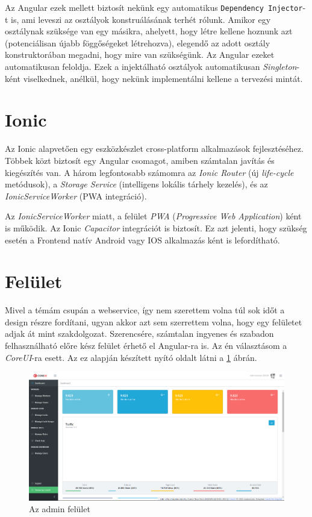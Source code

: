 \documentclass[a4paper,12pt]{thesis-ekf}
\theoremstyle{definition}
\begin{document}
    		Az Angular ezek mellett biztosít nekünk egy automatikus \verb|Dependency Injector|-t is, ami leveszi az osztályok konstruálásának terhét rólunk. Amikor egy osztálynak szüksége van egy másikra, ahelyett, hogy létre kellene hoznunk azt (potenciálisan újabb föggőségeket létrehozva), elegendő az adott osztály konstruktorában megadni, hogy mire van szükségünk. Az Angular ezeket automatikusan feloldja. Ezek a injektálható osztályok automatikusan \emph{Singleton}-ként viselkednek, anélkül, hogy nekünk implementálni kellene a tervezési mintát.\cite{angular-di}
		
		\section{Ionic}\label{sc-ionic}
    		Az Ionic alapvetően egy eszközkészlet cross-platform alkalmazások fejlesztéséhez. Többek közt biztosít egy Angular csomagot, amiben számtalan javítás és kiegészítés van\cite{ionic-intro}. A három legfontosabb számomra az \emph{Ionic Router} (új \emph{life-cycle} metódusok), a \emph{Storage Service} (intelligens lokális tárhely kezelés), és az \emph{IonicServiceWorker} (PWA integráció).
    		
    		Az \emph{IonicServiceWorker} miatt, a felület \emph{PWA} (\emph{Progressive Web Application}) ként is működik. Az Ionic \emph{Capacitor} integrációt is biztosít. Ez azt jelenti, hogy szükség esetén a Frontend natív Android vagy IOS alkalmazás ként is lefordítható.\cite{ionic-cap}
    		
		\section{Felület}
		    Mivel a témám csupán a webservice, így nem szerettem volna túl sok időt a design részre fordítani, ugyan akkor azt sem szerrettem volna, hogy egy  felületet adjak át mint szakdolgozat. Szerencsére, számtalan ingyenes és szabadon felhasználható előre kész felület érhető el Angular-ra is. Az én választásom a \emph{CoreUI}-ra esett. Az ez alapján készített nyító oldalt látni a \ref{fig-coreui-dash} ábrán.
		    
		    \begin{figure}[ht]
            	\centering
            	\includegraphics[width=1\textwidth]{images/coreui-dash.png}
            	\caption{Az admin fel\"ulet}
            	\label{fig-coreui-dash}
            \end{figure}
		    
\end{document}

